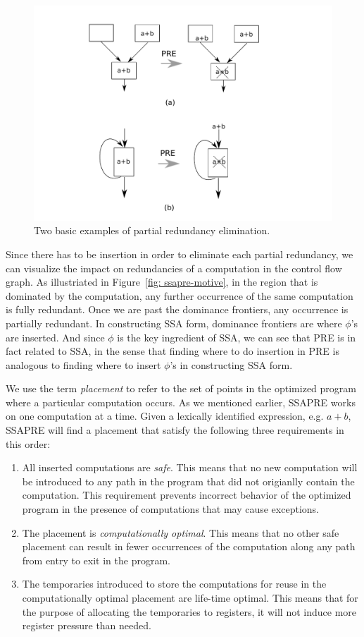 \begin{figure}
\centering
\includegraphics[scale=0.45]{fig-pre-examples.pdf}
\caption{Two basic examples of partial redundancy elimination.}
\label{fig: pre-examples}
\end{figure}

Since there has to be insertion in order to eliminate each partial
redundancy, we can visualize the impact on redundancies of a computation
in the control flow graph.  As illustriated in
Figure~\ref{fig: ssapre-motive}, in the region that is dominated by the 
computation, any further occurrence of the same computation is fully 
redundant.  Once we are past the dominance frontiers, any occurrence is
partially redundant.  In constructing SSA form, dominance frontiers are where
$\phi$'s are inserted.  And since $\phi$ is the key ingredient of SSA, we
can see that PRE is in fact related to SSA, in the sense that finding where
to do insertion in PRE is analogous to finding where to insert $\phi$'s in
constructing SSA form.

We use the term \emph{placement} to refer to the set of points in the 
optimized program where a particular computation occurs.
As we mentioned earlier, SSAPRE works on one computation at a time.
Given a lexically identified expression, e.g. $a+b$, SSAPRE will find
a placement that satisfy the following three requirements in this order:
\begin{enumerate}
\item All inserted computations are \emph{safe}.  This means that no new 
computation will be introduced to any path in the program that did not 
origianlly contain the computation.  This requirement prevents incorrect 
behavior of the optimized program in the presence of computations that may 
cause exceptions.
\item The placement is \emph{computationally optimal}.  This means that no
other safe placement can result in fewer occurrences of the computation
along any path from entry to exit in the program.
\item The temporaries introduced to store the computations for reuse in the
computationally optimal placement are life-time optimal.  This means that
for the purpose of allocating the temporaries to registers, it will not
induce more register pressure than needed.
\end{enumerate}

